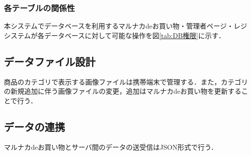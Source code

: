 \documentclass[a4j]{jarticle}
\begin{document}
\subsubsection{各テーブルの関係性}
本システムでデータベースを利用するマルナカdeお買い物・管理者ページ・レジシステムが各データベースに対して可能な操作を図\ref{tab:DB権限}に示す．
\begin{table}[H]
\caption{各テーブルに対して可能な操作を示した表}
\label{tab:DB権限}

\begin{center}
\end{center}
\end{table}

\subsection{データファイル設計}
商品のカテゴリで表示する画像ファイルは携帯端末で管理する．また，カテゴリの新規追加に伴う画像ファイルの変更，追加はマルナカdeお買い物を更新することで行う．\\
\subsection{データの連携}
マルナカdeお買い物とサーバ間のデータの送受信はJSON形式で行う．
\end{document}
